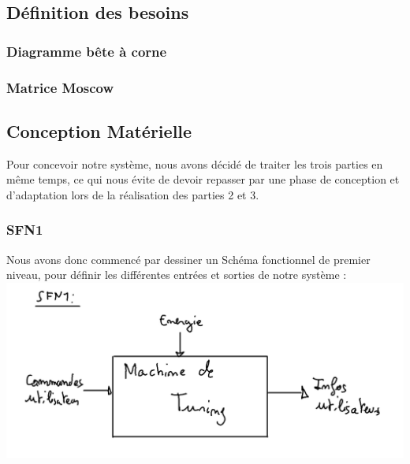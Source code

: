 \documentclass[12pt]{report}
\begin{document}
 	\subsection{Définition des besoins}
 	 \subsubsection{Diagramme bête à corne}
 	 \subsubsection{Matrice Moscow}
	 \subsection{Conception Matérielle}
	 Pour concevoir notre système, nous avons décidé de traiter les trois parties en même temps, ce qui nous évite de devoir repasser par une phase de conception et d'adaptation lors de la réalisation des parties 2 et 3.\\
	 \subsubsection{SFN1}
	 Nous avons donc commencé par dessiner un Schéma fonctionnel de premier niveau, pour définir les différentes entrées et sorties de notre système :\\
	 \includegraphics[width=\textwidth]{img/SFN1}
\end{document}
